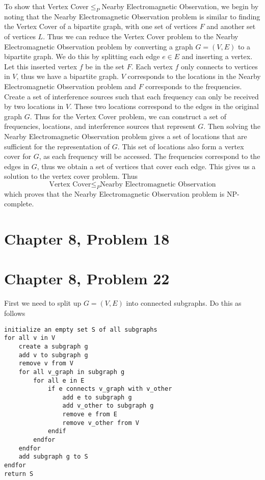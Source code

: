 \documentclass[12pt]{article}
\begin{document}
To show that Vertex Cover\(\leq_P\)Nearby Electromagnetic Observation, we begin by noting that the Nearby Electromagnetic Observation
problem is similar to finding the Vertex Cover of a bipartite graph, with one set of vertices \(F\) and another set of vertices \(L\). Thus we can reduce
the Vertex Cover problem to the Nearby Electromagnetic Observation problem by converting a graph \(G=(V,E)\) to a bipartite graph. We do this by splitting
each edge \(e\in E\) and inserting a vertex. Let this inserted vertex \(f\) be in the set \(F\). Each vertex \(f\) only connects to vertices in \(V\), thus
we have a bipartite graph. \(V\) corresponds to the locations in the Nearby Electromagnetic Observation problem and \(F\) corresponds to the frequencies.
Create a set of interference sources such that each frequency can only be received by two locations in \(V\). These two locations correspond to the edges in the original
graph \(G\). Thus for the Vertex Cover problem, we can construct a set of frequencies, locations, and interference sources that represent \(G\). Then solving
the Nearby Electromagnetic Observation problem gives a set of locations that are sufficient for the representation of \(G\). This set of locations also form
a vertex cover for \(G\), as each frequency will be accessed. The frequencies correspond to the edges in \(G\), thus we obtain a set of vertices that cover
each edge. This gives us a solution to the vertex cover problem. Thus
\[\text{Vertex Cover}\leq_P\text{Nearby Electromagnetic Observation}\]
which proves that the Nearby Electromagnetic Observation problem is NP-complete.

\pagebreak

\section*{Chapter 8, Problem 18}



\pagebreak

\section*{Chapter 8, Problem 22}

First we need to split up \(G=(V,E)\) into connected subgraphs. Do this as follows

\begin{verbatim}
initialize an empty set S of all subgraphs
for all v in V
    create a subgraph g
    add v to subgraph g
    remove v from V
    for all v_graph in subgraph g
        for all e in E
            if e connects v_graph with v_other
                add e to subgraph g
                add v_other to subgraph g
                remove e from E
                remove v_other from V
            endif
        endfor
    endfor
    add subgraph g to S
endfor
return S
\end{verbatim}
\end{document}
